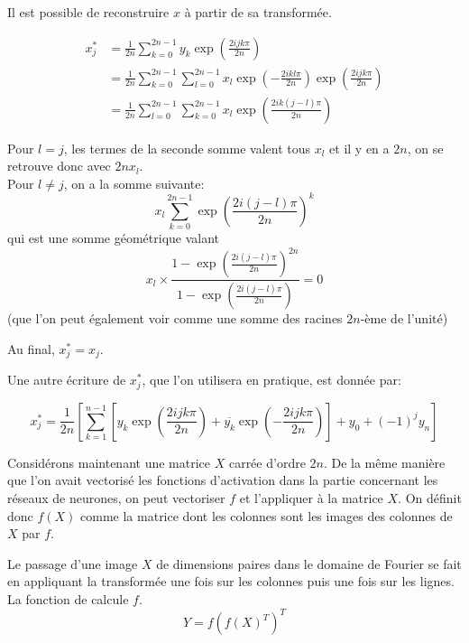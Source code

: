 Il est possible de reconstruire $x$ à partir de sa transformée.

\begin{align*}
x^{*}_j &= \frac{1}{2n} \sum_{k=0}^{2n-1} y_k \exp\left( \frac{2ijk\pi}{2n} \right)  \\
        &= \frac{1}{2n} \sum_{k=0}^{2n-1} \sum_{l = 0}^{2n-1} x_l \exp\left(-\frac{2ikl\pi}{2n}\right) \exp\left( \frac{2ijk\pi}{2n} \right) \\
		&= \frac{1}{2n} \sum_{l=0}^{2n-1} \sum_{k = 0}^{2n-1} x_l \exp\left(\frac{2ik(j-l)\pi}{2n}\right) 
\end{align*}

Pour $l = j$, les termes de la seconde somme valent tous $x_l$ et il y en a 
$2n$, on se retrouve donc avec $2n x_l$. \\
Pour $l \neq j$, on a la somme suivante:
\[
x_l \sum_{k = 0}^{2n-1} \exp\left(\frac{2i(j-l)\pi}{2n}\right)^k 
\]
qui est une somme géométrique valant
\[
x_l \times \frac{1-\exp\left(\frac{2i(j-l)\pi}{2n}\right)^{2n}}{1-\exp\left(\frac{2i(j-l)\pi}{2n}\right)} = 0
\]
(que l'on peut également voir comme une somme des racines $2n$-ème de l'unité)

Au final, $x^{*}_j = x_j$.

Une autre écriture de $x^{*}_j$, que l'on utilisera en pratique, est donnée par:

\[
x^{*}_j = \frac{1}{2n} \left[ \sum_{k=1}^{n-1} \left[ y_k \exp\left( \frac{2ijk\pi}{2n} \right) 
          + \overline{y_k} \exp\left(-\frac{2ijk\pi}{2n} \right) \right]
		  + y_0 + (-1)^{j} y_n \right]
\]


Considérons maintenant une matrice $X$ carrée d'ordre $2n$. 
De la même manière que l'on avait vectorisé les fonctions 
d'activation dans la partie concernant les réseaux de neurones, 
on peut vectoriser $f$ et l'appliquer à la matrice $X$. 
On définit donc $f(X)$ comme la matrice dont les colonnes sont 
les images des colonnes de $X$ par $f$.

Le passage d'une image $X$ de dimensions paires dans le domaine 
de Fourier se fait en appliquant la transformée une fois sur les 
colonnes puis une fois sur les lignes. 
La fonction  de  calcule $f$.
\[
Y = f(f(X)^T)^T
\]
